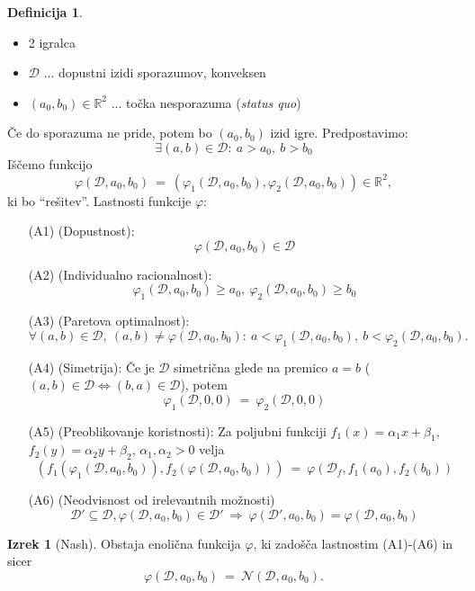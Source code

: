 \documentclass[11pt]{article}
\newcommand{\R}{\mathbb{R}}
\newcommand{\N}{\mathbb{N}}
\newcommand{\oklepaj}[1]{\left(#1\right)}
\newcommand{\1}{\mathbbm{1}}
\renewcommand{\N}{\mathcal{N}}
\newcommand{\D}{\mathcal{D}}
\theoremstyle{definition}
\newtheorem{definicija}{Definicija}[section]
\theoremstyle{definition}
\theoremstyle{definition}
\newtheorem{izrek}{Izrek}[section]
\theoremstyle{definition}
\begin{document}
\begin{definicija}
~
\begin{itemize}
	\item 2 igralca
	\item $\D$ ... dopustni izidi sporazumov, konveksen
	\item $(a_0,b_0)\in\R^2$ ... točka nesporazuma (\textit{status quo})
\end{itemize}
Če do sporazuma ne pride, potem bo $(a_0,b_0)$ izid igre. Predpostavimo:
$$\exists (a,b) \in \D: ~a>a_0,~b>b_0$$
Iščemo funkcijo 
$$\varphi(\D,a_0,b_0) ~=~ \oklepaj{\varphi_1(\D,a_0,b_0),\varphi_2(\D,a_0,b_0)} \in \R^2,$$
ki bo ``rešitev''. Lastnosti funkcije $\varphi$:
\begin{enumerate}

\item[(A1)] (Dopustnost):
$$\varphi(\D,a_0,b_0) \in \D$$

\item[(A2)] (Individualno racionalnost):
$$\varphi_1(\D,a_0,b_0) \geq a_0,~\varphi_2(\D,a_0,b_0)\geq b_0$$

\item[(A3)] (Paretova optimalnost):
$$\forall (a,b)\in\D,~(a,b)\neq\varphi(\D,a_0,b_0):~a<\varphi_1(\D,a_0,b_0),~b<\varphi_2(\D,a_0,b_0).$$

\item[(A4)] (Simetrija): Če je $\D$ simetrična glede na premico $a=b$ \hbox{($(a,b)\in\D \iff (b,a)\in\D$)}, potem
$$\varphi_1(\D,0,0) ~=~ \varphi_2(\D,0,0)$$

\item[(A5)] (Preoblikovanje koristnosti): Za poljubni funkciji $f_1(x) = \alpha_1 x + \beta_1$, $f_2(y) = \alpha_2 y + \beta_2$, $\alpha_1,\alpha_2>0$ velja
$$\oklepaj{f_1\oklepaj{\varphi_1(\D,a_0,b_0)}, f_2\oklepaj{\varphi(\D,a_0,b_0)}} ~=~ \varphi\oklepaj{\D_f,f_1(a_0),f_2(b_0)}$$

\item[(A6)] (Neodvisnost od irelevantnih možnosti)
$$\D' \subseteq \D, \varphi(\D,a_0,b_0)\in\D' ~\Rightarrow~ \varphi(\D',a_0,b_0) = \varphi(\D,a_0,b_0)$$

\end{enumerate}

\end{definicija}
\vspace{0.5cm}

\begin{izrek}[Nash]

Obstaja enolična funkcija $\varphi$, ki zadošča lastnostim (A1)-(A6) in sicer
$$\varphi(\D,a_0,b_0) ~=~ \N(\D,a_0,b_0).$$

\end{izrek}
\vspace{0.5cm}
\end{document}
